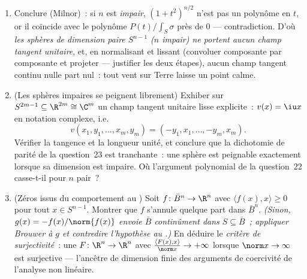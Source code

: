 \begin{problem}
\begin{enumerate}[resume]
        \[
        P(t) = \pm(1 + t^2)^{n/2}\int_S\sigma,
        \qquad\text{avec le signe } + \text{ pour } t
        \text{ petit}
        \]
        ( préservée par continuité depuis $t =
        0$).
  \item Conclure (Milnor)~: si $n$ est \emph{impair}, $(1 +
        t^2)^{n/2}$ n'est pas un polynôme en $t$, or il
        coïncide avec le polynôme $P(t)/\int_S\sigma$ près
        de $0$ --- contradiction. D'où \emph{les sphères de
        dimension paire $S^{n-1}$ ($n$ impair) ne portent
        aucun champ tangent unitaire}, et, en normalisant et
        lissant (convoluer composante par composante et
        projeter --- justifier les deux étapes), aucun champ
        tangent continu nulle part nul~: tout vent sur Terre
        laisse un point calme.

  \item (Les sphères impaires se peignent librement)
        Exhiber sur $S^{2m-1} \subseteq \R^{2m} \cong \C^m$
        un champ tangent unitaire lisse explicite~: $v(x) =
        \iu x$ en notation complexe, i.e.
        \[
        v(x_1, y_1, \dots, x_m, y_m) =
        (-y_1, x_1, \dots, -y_m, x_m) .
        \]
        Vérifier la tangence et la longueur unité, et
        conclure que la dichotomie de parité de la
        question~23 est tranchante~: une sphère est peignable
        exactement lorsque sa dimension est impaire. Où
        l'argument polynomial de la question~22 casse-t-il
        pour $n$ pair~?
  \item (Zéros issus du comportement au ) Soit $f \colon
        \bar B^n \to \R^n$  avec $\langle f(x),
        x\rangle \geq 0$ pour tout $x \in S^{n-1}$. Montrer
        que $f$ s'annule quelque part dans $\bar B^n$.
        \emph{(Sinon, $g(x) = -f(x)/\norm{f(x)}$ envoie
        $\bar B$ continûment dans $S \subseteq \bar B$~;
        appliquer Brouwer à $g$ et contredire l'hypothèse
        au .)} En déduire le \emph{critère de
        surjectivité}~: une 
        $F\colon\R^n\to\R^n$ avec $\frac{\langle F(x),
        x\rangle}{\norm x} \to +\infty$ lorsque $\norm x
        \to \infty$ est surjective --- l'ancêtre de
        dimension finie des arguments de coercivité de
        l'analyse non linéaire.
\end{enumerate}
\end{problem}
